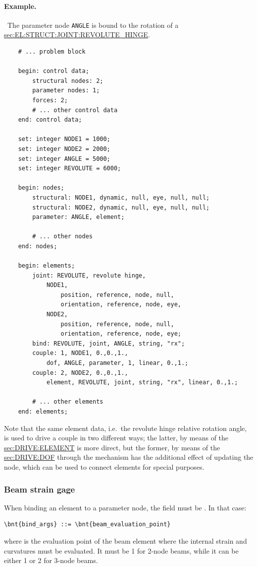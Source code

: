 \paragraph{Example.} \
The parameter node \texttt{ANGLE} is bound to the rotation of a 
\hyperref{\kw{revolute hinge}}{\kw{revolute hinge} (see Section~}{)}{sec:EL:STRUCT:JOINT:REVOLUTE_HINGE}.
\begin{verbatim}
    # ... problem block

    begin: control data;
        structural nodes: 2;
        parameter nodes: 1;
        forces: 2;
        # ... other control data
    end: control data;

    set: integer NODE1 = 1000;
    set: integer NODE2 = 2000;
    set: integer ANGLE = 5000;
    set: integer REVOLUTE = 6000;

    begin: nodes;
        structural: NODE1, dynamic, null, eye, null, null;
        structural: NODE2, dynamic, null, eye, null, null;
        parameter: ANGLE, element;

        # ... other nodes
    end: nodes;

    begin: elements;
        joint: REVOLUTE, revolute hinge,
            NODE1,
                position, reference, node, null,
                orientation, reference, node, eye,
            NODE2,
                position, reference, node, null,
                orientation, reference, node, eye;
        bind: REVOLUTE, joint, ANGLE, string, "rx";
        couple: 1, NODE1, 0.,0.,1.,
            dof, ANGLE, parameter, 1, linear, 0.,1.;
        couple: 2, NODE2, 0.,0.,1.,
            element, REVOLUTE, joint, string, "rx", linear, 0.,1.;

        # ... other elements
    end: elements;
\end{verbatim}
Note that the same element data, i.e.\ the revolute hinge
relative rotation angle, is used to drive a couple in two different
ways; the latter, by means of the 
\hyperref{\kw{element} drive}{\kw{element} drive (see Section~}{)}{sec:DRIVE:ELEMENT}
is more direct, but the former, by means of the 
\hyperref{\kw{dof} drive}{\kw{dof} drive (see Section~}{)}{sec:DRIVE:DOF}
through the \kw{bind} mechanism has the additional effect of updating
the \kw{parameter} node, which can be used to connect
 elements for special purposes.

\subsubsection{Beam strain gage}
When binding an element to a
parameter node, the \nt{element\_type} field must be \kw{beam}.
In that case:
\begin{Verbatim}[commandchars=\\\{\}]
    \bnt{bind_args} ::= \bnt{beam_evaluation_point}
\end{Verbatim}
where  is the evaluation point of the beam element
where the internal strain and curvatures must be evaluated.
It must be 1 for 2-node beams, while it can be either 1 or 2
for 3-node beams.

